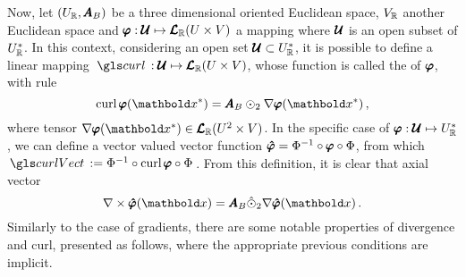 Now, let $(U_{\mathbb{R}},\pmb{A}_B)$ be a three dimensional oriented Euclidean space, $V_{\mathbb{R}}$ another Euclidean space and $\pmb{{\varphi}} : {\pmb{\mathcal{U}}} \mapsto \pmb{\mathcal{L}}_{\mathbb{R}}(U\times V)$ a mapping where $\pmb{\mathcal{U}}$ is an open subset of $U_{\mathbb{R}}^*$. In this context, considering an open set $\pmb{\mathcal{U}}\subset U_{\mathbb{R}}^*$, it is possible to define a linear mapping  $\map{\gloref{curl}}{{\tnr{\mathcal{U}}}}{\ete{\cam{R}}{U\times V}}$, whose function is called the  of $\pmb{\varphi}$, with rule
\begin{equation}\label{eq:curl}
\fua{\crl{\tnr{{\varphi}}}}{\vto{x}^*}=\tnr{A}_B\odot_{2}\fua{\nabla\tnr{{\varphi}}}{\vto{x}^*}\,,
\end{equation}
where tensor $\fua{\nabla\tnr{{\varphi}}}{\vto{x}^*}\in\ete{\cam{R}}{U^2\times V}$. In the specific case of $\pmb{{\varphi}} : {{\pmb{\mathcal{U}}}} \mapsto U_{\mathbb{R}}^*$, we can define a vector valued vector function $\pmb{\hat{\varphi}}=\Phi^{-1}\circ\pmb{{\varphi}}\circ\Phi$, from which $\gloref{curlVect}:=\Phi^{-1}\circ\crl{\tnr{{\varphi}}}\circ\Phi\,$. From this definition, it is clear that axial vector
\begin{equation}\label{eq:curlVect}
\nabla\times\tnr{\hat{\varphi}}(\vto{x})=\tnr{A}_B\hat{\odot}_{2}\fua{\nabla\tnr{\hat{\varphi}}}{\vto{x}}\,.
\end{equation}
Similarly to the case of gradients, there are some notable properties of divergence and curl, presented as follows, where the appropriate previous conditions are implicit.
